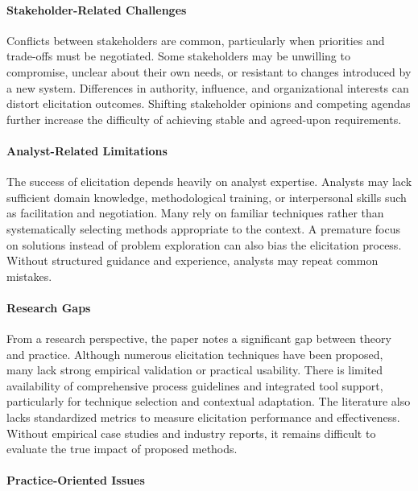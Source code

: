 \paragraph{Stakeholder-Related Challenges}

Conflicts between stakeholders are common, particularly when priorities and trade-offs must be negotiated. Some stakeholders may be unwilling to compromise, unclear about their own needs, or resistant to changes introduced by a new system. Differences in authority, influence, and organizational interests can distort elicitation outcomes. Shifting stakeholder opinions and competing agendas further increase the difficulty of achieving stable and agreed-upon requirements.

\paragraph{Analyst-Related Limitations}

The success of elicitation depends heavily on analyst expertise. Analysts may lack sufficient domain knowledge, methodological training, or interpersonal skills such as facilitation and negotiation. Many rely on familiar techniques rather than systematically selecting methods appropriate to the context. A premature focus on solutions instead of problem exploration can also bias the elicitation process. Without structured guidance and experience, analysts may repeat common mistakes.

\paragraph{Research Gaps}

From a research perspective, the paper notes a significant gap between theory and practice. Although numerous elicitation techniques have been proposed, many lack strong empirical validation or practical usability. There is limited availability of comprehensive process guidelines and integrated tool support, particularly for technique selection and contextual adaptation. The literature also lacks standardized metrics to measure elicitation performance and effectiveness. Without empirical case studies and industry reports, it remains difficult to evaluate the true impact of proposed methods.

\paragraph{Practice-Oriented Issues}

